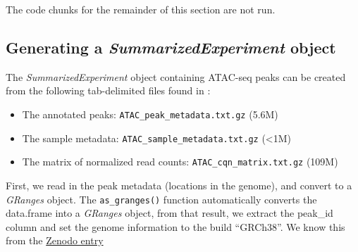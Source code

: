 \documentclass[
  9pt,
  a4paper,
]{extarticle}
\newenvironment{Shaded}{\begin{snugshade}}{\end{snugshade}}
\newcommand{\DataTypeTok}[1]{\textcolor[rgb]{0.13,0.29,0.53}{#1}}
\newcommand{\KeywordTok}[1]{\textcolor[rgb]{0.13,0.29,0.53}{\textbf{#1}}}
\newcommand{\NormalTok}[1]{#1}
\newcommand{\OperatorTok}[1]{\textcolor[rgb]{0.81,0.36,0.00}{\textbf{#1}}}
\newcommand{\StringTok}[1]{\textcolor[rgb]{0.31,0.60,0.02}{#1}}
\begin{document}
The code chunks for the remainder of this section are not run.

\hypertarget{generating-a-summarizedexperiment-object}{%
\subsection{\texorpdfstring{Generating a \emph{SummarizedExperiment} object}{Generating a SummarizedExperiment object}}\label{generating-a-summarizedexperiment-object}}

The \emph{SummarizedExperiment} object containing ATAC-seq peaks can be created from
the following tab-delimited files found in \citep{alasooZenodo}:

\begin{itemize}
\item
  The annotated peaks: \texttt{ATAC\_peak\_metadata.txt.gz} (5.6M)
\item
  The sample metadata: \texttt{ATAC\_sample\_metadata.txt.gz} (\textless1M)
\item
  The matrix of normalized read counts: \texttt{ATAC\_cqn\_matrix.txt.gz} (109M)
\end{itemize}

First, we read in the peak metadata (locations in the genome), and convert to a
\emph{GRanges} object. The \texttt{as\_granges()} function automatically converts the
data.frame into a \emph{GRanges} object, from that result, we extract the peak\_id
column and set the genome information to the build ``GRCh38''. We know this from
the \href{https://zenodo.org/record/1188300\#.XJOFSlNKiL5}{Zenodo entry}

\begin{Shaded}
\end{Shaded}
\end{document}
